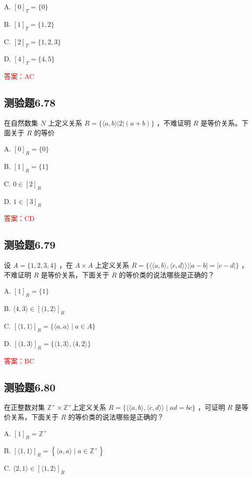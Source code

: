 \documentclass[UTF8, heading=true]{ctexart}
\begin{document}
A. $[0]_T=\{0\}$

B. $[1]_T=\{1,2\}$


C. $[2]_T=\{1,2,3\}$

D. $[4]_T=\{4,5\}$


\textcolor{red}{答案：AC}

\subsection{测验题6.78}

在自然数集 $N$ 上定义关系 $R=\{\langle a, b\rangle|2|(a+b)\}$ ，不难证明 $R$ 是等价关系。下面关于 $R$ 的等价

A. $[0]_R=\{0\}$

B. $[1]_R=\{1\}$

C. $0 \in[2]_R$

D. $1 \in[3]_R$

\textcolor{red}{答案：CD}

\subsection{测验题6.79}

设 $A=\{1,2,3,4\}$ ，在 $A \times A$ 上定义关系 $R=\{\langle\langle a, b\rangle,\langle c, d\rangle\rangle| | a-b|=|c-d|\}$ ，不难证明 $R$ 是等价关系，下面关于 $R$ 的等价类的说法哪些是正确的？

A. $[1]_R=\{1\}$

B. $\langle 4,3\rangle \in[\langle 1,2\rangle]_R$

C. $[\langle 1,1\rangle]_R=\{\langle a, a\rangle \mid a \in A\}$

D. $[\langle 1,3\rangle]_R=\{\langle 1,3\rangle,\langle 4,2\rangle\}$


\textcolor{red}{答案：BC}

\subsection{测验题6.80}

在正整数对集 $\mathbb{Z}^{+} \times \mathbb{Z}^{+}$上定义关系 $R=\{\langle\langle a, b\rangle,\langle c, d\rangle\rangle \mid a d=b c\}$ ，可证明 $R$ 是等价关系，下面关于 $R$ 的等价类的说法哪些是正确的？

A. $[1]_R=\mathbb{Z}^{+}$

B. $[\langle 1,1\rangle]_R=\left\{\langle a, a\rangle \mid a \in \mathbb{Z}^{+}\right\}$

C. $\langle 2,1\rangle \in[\langle 1,2\rangle]_R$
\end{document}
